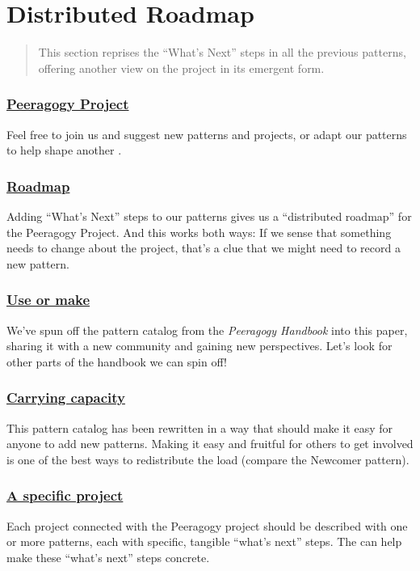 \section{Distributed Roadmap} \label{sec:Distributed_Roadmap}

\begin{quote}
This section reprises the ``What's Next'' steps in all the previous
patterns, offering another view on the project 
in its emergent form.
\end{quote}

\subsubsection*{\hyperref[sec:Peeragogy_Project]{Peeragogy Project}} Feel free to join us and suggest new patterns and projects, or adapt our patterns to help shape another .

\subsubsection*{\hyperref[sec:Roadmap]{Roadmap}} Adding ``What's Next'' steps to our patterns gives us a ``distributed roadmap'' for the Peeragogy Project.  And this works both ways:   If we sense that something needs to change about the project, that's a clue that we might need to record a new pattern.

\subsubsection*{\hyperref[sec:Use_or_make]{Use or make}} 
We've spun off the pattern catalog from the \emph{Peeragogy Handbook} into this paper, sharing it with a new community and gaining new perspectives.  Let's look for other parts of the handbook we can spin off!

\subsubsection*{\hyperref[sec:Carrying_capacity]{Carrying capacity}} This pattern catalog has been rewritten in a way that should make it
easy for anyone to add new patterns. Making it easy and fruitful for
others to get involved is one of the best ways to redistribute the load
(compare the Newcomer pattern).

\subsubsection*{\hyperref[sec:A_specific_project]{A specific project}}
 Each project connected with the Peeragogy project should be described with one or more patterns, each with specific, tangible ``what's next'' steps.  The  can help make these ``what's next'' steps concrete.

